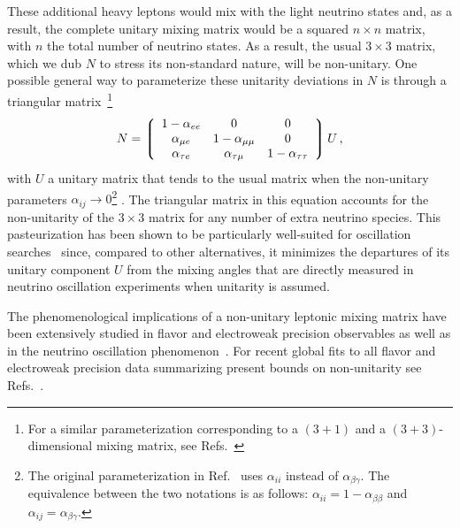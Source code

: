 These additional heavy leptons would mix with the light neutrino states and, as a result, the complete unitary mixing matrix would be a squared $n \times n$ matrix, with $n$ the total number of neutrino
states. As a result, the usual $3 \times 3$  matrix, which we dub $N$ to stress its non-standard nature, will be
non-unitary. One possible general way to parameterize these unitarity deviations in $N$ is through a triangular matrix~\cite{Escrihuela:2015wra}\footnote{For a similar parameterization corresponding to a $(3+1)$ and a $(3+3)$-dimensional mixing matrix,  see Refs.~\cite{Xing:2007zj,Xing:2011ur}}
 \begin{equation}
  N = 
 \left\lgroup
 \begin{array}{ccc} 
 1-\alpha_{ee} & 0 & 0 \\
 \alpha_{\mu e} & 1-\alpha_{\mu \mu} & 0 \\
  \alpha_{\tau e} & \alpha_{\tau \mu} & 1-\alpha_{\tau \tau}
 \end{array}
 \right \rgroup U \,,
 \label{eq:triangular}
 \end{equation}
with $U$ a unitary matrix that tends to the usual  matrix when the non-unitary parameters $\alpha_{ij} \rightarrow 0$\footnote{The original parameterization in Ref.~\cite{Escrihuela:2015wra} uses $\alpha_{ii}$ instead of $\alpha_{\beta\gamma}$. The equivalence between the two notations is as follows: $\alpha_{ii} = 1-\alpha_{\beta\beta}$ and $\alpha_{ij} = \alpha_{\beta\gamma}$.} .
%
The triangular matrix in this equation accounts for the non-unitarity of the $3 \times 3$ matrix for any number of extra neutrino species. This pasteurization has been shown to be particularly well-suited for oscillation searches~\cite{Escrihuela:2015wra,Blennow:2016jkn} since, compared to other alternatives, it minimizes the departures of its unitary component $U$ from the mixing angles that are directly measured in neutrino oscillation experiments when unitarity is assumed.

The phenomenological implications of a non-unitary leptonic mixing matrix have been extensively studied in flavor and electroweak precision observables as well as in the neutrino oscillation phenomenon~\cite{Shrock:1980vy,Schechter:1980gr,Shrock:1980ct,Shrock:1981wq,Langacker:1988ur,Bilenky:1992wv,Nardi:1994iv,Tommasini:1995ii,Antusch:2006vwa,FernandezMartinez:2007ms,Antusch:2008tz,Biggio:2008in,Antusch:2009pm,Forero:2011pc,Alonso:2012ji,Antusch:2014woa,Abada:2015trh,Fernandez-Martinez:2015hxa,Escrihuela:2015wra,Parke:2015goa,Miranda:2016wdr,Fong:2016yyh,Escrihuela:2016ube}. For recent global fits to all flavor and electroweak precision data summarizing present bounds on non-unitarity see Refs.~\cite{Antusch:2014woa,Fernandez-Martinez:2016lgt}. 



